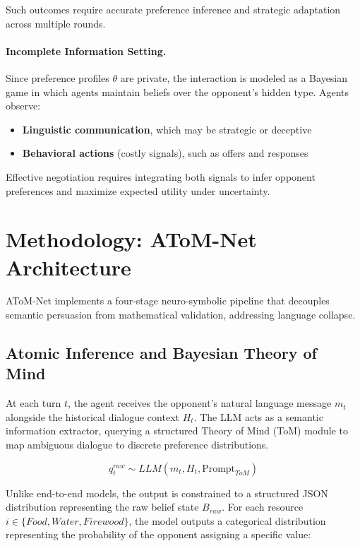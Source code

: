 \documentclass[11pt]{article}
\begin{document}
Such outcomes require accurate preference inference and strategic adaptation across multiple rounds.

\paragraph{Incomplete Information Setting.}
Since preference profiles $\theta$ are private, the interaction is modeled as a Bayesian game in which agents maintain beliefs over the opponent's hidden type. Agents observe:
\begin{itemize}
\item \textbf{Linguistic communication}, which may be strategic or deceptive
\item \textbf{Behavioral actions} (costly signals), such as offers and responses
\end{itemize}

Effective negotiation requires integrating both signals to infer opponent preferences and maximize expected utility under uncertainty.

\section{Methodology: AToM-Net Architecture}
AToM-Net implements a four-stage neuro-symbolic pipeline that decouples semantic persuasion from mathematical validation, addressing language collapse.

\subsection{Atomic Inference and Bayesian Theory of Mind}

At each turn $t$, the agent receives the opponent's natural language message $m_t$ alongside the historical dialogue context $H_t$. The LLM acts as a semantic information extractor, querying a structured Theory of Mind (ToM) module to map ambiguous dialogue to discrete preference distributions.

\begin{equation}
q^{raw}_t \sim LLM(m_t, H_t, \text{Prompt}_{ToM})
\end{equation}

Unlike end-to-end models, the output is constrained to a structured JSON distribution representing the raw belief state $B_{raw}$. For each resource $i \in \{Food, Water, Firewood\}$, the model outputs a categorical distribution representing the probability of the opponent assigning a specific value:
\end{document}
